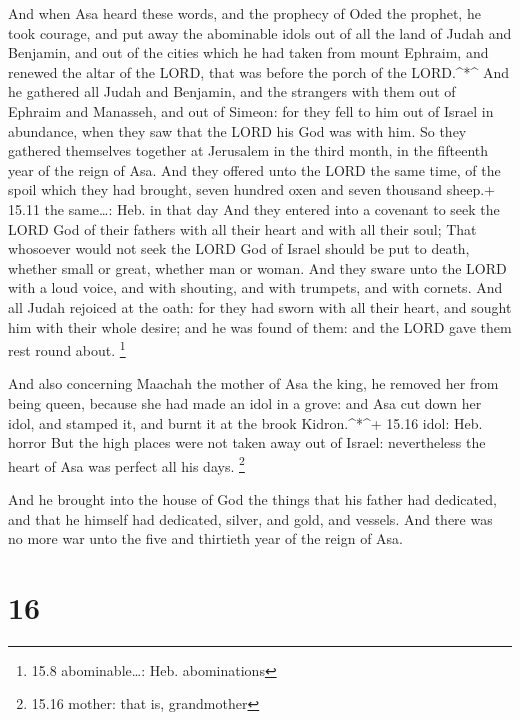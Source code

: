  And when Asa heard these words, and the prophecy of Oded
the prophet, he took courage, and put away the abominable idols out of
all the land of Judah and Benjamin, and out of the cities which he had
taken from mount Ephraim, and renewed the altar of the LORD, that was
before the porch of the LORD.\^{}*\^{}  And he gathered all
Judah and Benjamin, and the strangers with them out of Ephraim and
Manasseh, and out of Simeon: for they fell to him out of Israel in
abundance, when they saw that the LORD his God was with him.
 So they gathered themselves together at Jerusalem in the
third month, in the fifteenth year of the reign of Asa. 
And they offered unto the LORD the same time, of the spoil which they
had brought, seven hundred oxen and seven thousand sheep.+ 15.11 the
same\ldots: Heb. in that day  And they entered into a
covenant to seek the LORD God of their fathers with all their heart and
with all their soul;  That whosoever would not seek the
LORD God of Israel should be put to death, whether small or great,
whether man or woman.  And they sware unto the LORD with a
loud voice, and with shouting, and with trumpets, and with cornets.
 And all Judah rejoiced at the oath: for they had sworn
with all their heart, and sought him with their whole desire; and he was
found of them: and the LORD gave them rest round about. \footnote{15.8
  abominable\ldots: Heb. abominations}

 And also concerning Maachah the mother of Asa the king, he
removed her from being queen, because she had made an idol in a grove:
and Asa cut down her idol, and stamped it, and burnt it at the brook
Kidron.\^{}*\^{}+ 15.16 idol: Heb. horror  But the high
places were not taken away out of Israel: nevertheless the heart of Asa
was perfect all his days. \footnote{15.16 mother: that is, grandmother}

 And he brought into the house of God the things that his
father had dedicated, and that he himself had dedicated, silver, and
gold, and vessels.  And there was no more war unto the five
and thirtieth year of the reign of Asa.

\hypertarget{section-15}{%
\section{16}\label{section-15}}

